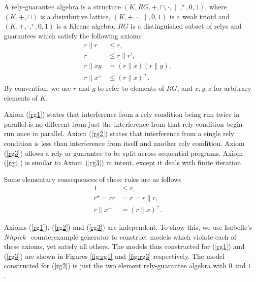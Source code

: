 \documentclass{llncs}
\begin{document}




A rely-guarantee algebra is a structure
$(K,RG,+,\sqcap,\cdot,\|,^\star,0,1)$, where $(K,+,\sqcap)$ is a
distributive lattice, $(K,+,\cdot,\|,0,1)$ is a weak trioid and
$(K,+,\cdot,^\star,0,1)$ is a Kleene algebra. $RG$ is a distinguished
subset of relys and guarantees which satisfy the following axioms
\begin{align}
r\|r &\le r, \label{rg1}\\
r &\le r\|r', \label{rg2}\\
r\|xy &= (r\|x)(r\|y), \label{rg3}\\
r\|x^+ &\le (r\|x)^+ \label{rg4}.
\end{align}
By convention, we use $r$ and $g$ to refer to elements of $RG$, and
$x,y,z$ for arbitrary elements of $K$. 

Axiom (\ref{rg1}) states that interference from a rely condition being
run twice in parallel is no different from just the interference from
that rely condition begin run once in parallel. Axiom (\ref{rg2})
states that interference from a single rely condition is less than
interference from itself and another rely condition. Axiom (\ref{rg3})
allows a rely or guarantee to be split across sequential
programs. Axiom (\ref{rg4}) is similar to Axiom (\ref{rg3}) in intent,
except it deals with finite iteration.

Some elementary consequences of these rules are as follows
\begin{align*}
1 &\le r,\\
r^\star = rr &= r = r\|r,\\
r\|x^+ &= (r\|x)^+.
\end{align*}




Axioms (\ref{rg1}), (\ref{rg2}) and (\ref{rg3}) are independent. To
show this, we use Isabelle's
\emph{Nitpick}~\cite{blanchette_nitpick:_2010} counterexample generator
to construct models which violate each of these axioms, yet satisfy
all others. The models thus constructed for (\ref{rg1}) and
(\ref{rg3}) are shown in Figures \ref{fig:rg1} and \ref{fig:rg3}
respectively. The model constructed for (\ref{rg2}) is just the two
element rely-guarantee algebra with $0$ and $1$.
\end{document}
